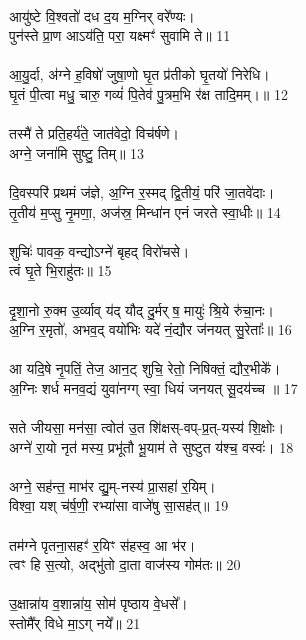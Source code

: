 \\
आयु॑ष्टे वि॒श्वतो॑ दध द॒य म॒ग्निर् वरे᳚ण्यः।\\
पुन॑स्ते प्रा॒ण आऽय॑ति॒ परा॒ यक्ष्मꣳ॑ सुवामि ते॥ 11\\
\\
आ॒यु॒र्दा, अ॑ग्ने ह॒विषो॑ जुषा॒णो घृ॒त प्र॑तीको घृ॒तयो॑ निरेधि।\\
घृ॒तं पी॒त्वा मधु॒ चारु॒ गव्यं॑ पि॒तेव॑ पु॒त्रम॒भि र॑क्ष तादि॒मम्।॥ 12\\
\\
तस्मै॑ ते प्रति॒हर्य॑ते॒ जात॑वेदो॒ विच॑र्षणे।\\
अग्ने॒ जना॑मि सुष्टु॒ तिम्॥ 13\\
\\
दि॒वस्परि॑ प्रथमं ज॑ज्ञे, अ॒ग्नि र॒स्मद् द्वि॒तीयं॒ परि॑ जा॒तवे॑दाः।\\
तृ॒तीय॑ म॒प्सु नृ॒मणा॒, अज॑स्र॒ मिन्धा॑न एनं जरते स्वा॒धीः॥ 14\\
\\
शुचिः॑ पावक॒ वन्द्योऽग्ने॑ बृहद् विरो॑चसे।\\
त्वं घृ॒ते भि॒राहु॑तः॥ 15\\
\\
दृ॒शा॒नो रु॒क्म उ॒र्व्याव् य॑द् यौद् दु॒र्मर् ष॒ मायुः॑ श्रि॒ये रु॑चा॒नः।\\
अ॒ग्नि र॒मृतो॑, अभव॒द् वयो॑भिः यदे॑ नं॒द्यौर ज॑नयत् सु॒रेताः᳚॥ 16\\
\\
आ यदि॒षे नृ॒पतिं॒ तेज॒ आन॒ट् शुचि॒ रेतो॒ निषिक्तं॒ द्यौर॒भीके᳚।\\
अ॒ग्निः शर्ध मनव॒द्यं युवा॑नग्ग् स्वा॒ धियं जनयत् सू॒दय॑च्च ॥ 17\\
\\
सते जीयसा॒ मन॑सा॒ त्वोत॑ उ॒त शि॑क्षस्-वप्-प्र॒त्-यस्य॑ शि॒क्षोः।\\
अग्ने॑ रा॒यो नृत॑ मस्य॒ प्रभू॑तौ भू॒याम॑ ते सुष्टुत य॑श्च॒ वस्वः॑। 18\\
\\
अग्ने॒ सह॑न्त॒ माभ॑र द्यु॒म्-नस्य॑  प्रा॒सहा॑ र॒यिम्।\\
विश्वा॒ यश् च॑र्ष॒णी॒ रभ्या॑सा वाजे॑षु सा॒सह॑त्॥ 19\\
\\
तम॑ग्ने पृतना॒सहꣳ॑ र॒यिꣳ स॑हस्व॒ आ भ॑र।\\
त्वꣳ हि स॒त्यो, अद्भु॑तो दा॒ता वाज॑स्य गोम॑तः॥ 20\\
\\
उ॒क्षान्ना॑य व॒शान्ना॑य॒ सोम॑ पृष्ठाय वे॒धसे᳚।\\
स्तोमै᳚र् विधे मा॒ऽग् नये᳚॥ 21\\
\\
